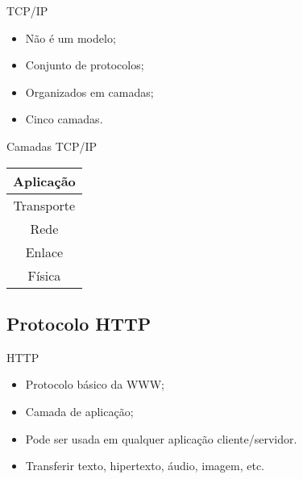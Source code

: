 \begin{frame}{TCP/IP}
	\begin{block}{}
		\begin{itemize}
			\item Não é um modelo; \pause
			\item Conjunto de protocolos; \pause
			\item Organizados em camadas; \pause
			\item Cinco camadas.
		\end{itemize}
	\end{block}
\end{frame}
\begin{frame}
	\begin{block}{Camadas TCP/IP}
			\centering
			\begin{table}
				\begin{tabular}{|c|}
					\hline
					Aplicação \\ \hline
					Transporte \\ \hline
					Rede \\ \hline
					Enlace\\ \hline
					Física\\ \hline
				\end{tabular}
			\end{table}
	\end{block}
\end{frame}

\subsection{Protocolo HTTP}

\begin{frame}{HTTP}
	\begin{itemize}
		\item Protocolo básico da WWW; \pause
		\item Camada de aplicação;
		\item Pode ser usada em qualquer aplicação cliente/servidor.
		\item Transferir texto, hipertexto, áudio, imagem, etc.
	\end{itemize}
\end{frame}
